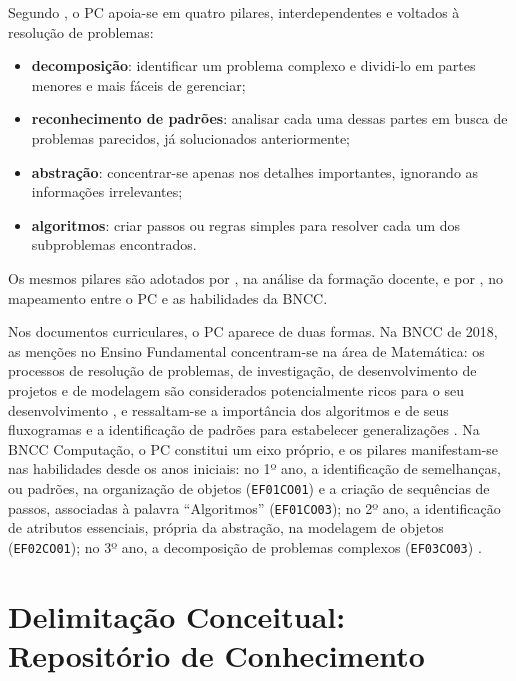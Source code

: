 Segundo , o PC apoia-se em quatro pilares, interdependentes e voltados à resolução de problemas:

\begin{itemize}
    \item \textbf{decomposição}: identificar um problema complexo e dividi-lo em partes menores e mais fáceis de gerenciar;
    \item \textbf{reconhecimento de padrões}: analisar cada uma dessas partes em busca de problemas parecidos, já solucionados anteriormente;
    \item \textbf{abstração}: concentrar-se apenas nos detalhes importantes, ignorando as informações irrelevantes;
    \item \textbf{algoritmos}: criar passos ou regras simples para resolver cada um dos subproblemas encontrados.
\end{itemize}

\noindent Os mesmos pilares são adotados por , na análise da formação docente, e por , no mapeamento entre o PC e as habilidades da BNCC.

Nos documentos curriculares, o PC aparece de duas formas. Na BNCC de 2018, as menções no Ensino Fundamental concentram-se na área de Matemática: os processos de resolução de problemas, de investigação, de desenvolvimento de projetos e de modelagem são considerados potencialmente ricos para o seu desenvolvimento \cite[p.~266]{brasil2018bncc}, e ressaltam-se a importância dos algoritmos e de seus fluxogramas e a identificação de padrões para estabelecer generalizações \cite[p.~271]{brasil2018bncc}. Na BNCC Computação, o PC constitui um eixo próprio, e os pilares manifestam-se nas habilidades desde os anos iniciais: no 1º ano, a identificação de semelhanças, ou padrões, na organização de objetos (\texttt{EF01CO01}) e a criação de sequências de passos, associadas à palavra ``Algoritmos'' (\texttt{EF01CO03}); no 2º ano, a identificação de atributos essenciais, própria da abstração, na modelagem de objetos (\texttt{EF02CO01}); no 3º ano, a decomposição de problemas complexos (\texttt{EF03CO03}) \cite[p.~12, 16, 18]{brasil2022complemento}.



\section{Delimitação Conceitual: Repositório de Conhecimento}
\label{sec-referencial-delimitacao}

